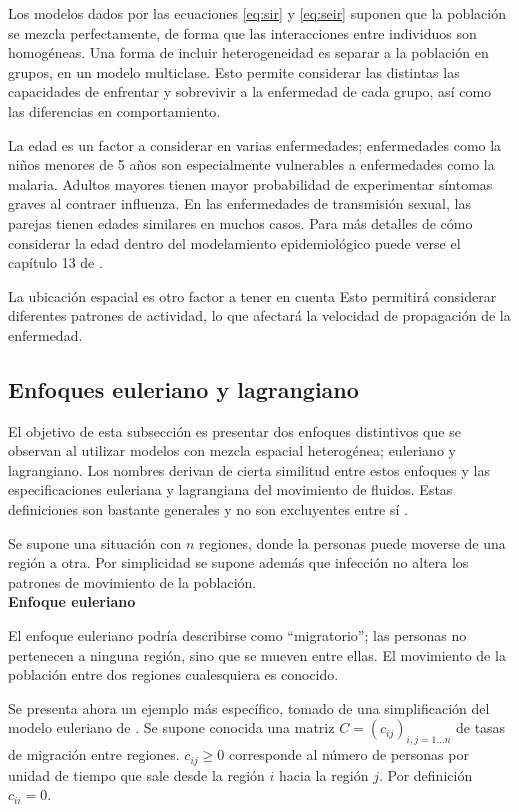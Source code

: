 Los modelos dados por las ecuaciones \ref{eq:sir} y \ref{eq:seir} suponen que la población se mezcla perfectamente, de forma que las interacciones entre individuos son homogéneas. Una forma de incluir heterogeneidad es separar a la población en grupos, en un modelo multiclase. Esto permite considerar las distintas las capacidades de enfrentar y sobrevivir a la enfermedad de cada grupo, así como las diferencias en comportamiento.

La edad es un factor a considerar en varias enfermedades; enfermedades como la  niños menores de 5 años son especialmente vulnerables a enfermedades como la malaria. Adultos mayores tienen mayor probabilidad de experimentar síntomas graves al contraer influenza. En las enfermedades de transmisión sexual, las parejas tienen edades similares en muchos casos. Para más detalles de cómo considerar la edad dentro del modelamiento epidemiológico puede verse el capítulo 13 de \cite{Brauer2019}.

La ubicación espacial es otro factor a tener en cuenta
Esto permitirá considerar diferentes patrones de actividad, lo que afectará la velocidad de propagación de la enfermedad.
\subsection{Enfoques euleriano y lagrangiano}

El objetivo de esta subsección es presentar dos enfoques distintivos que se observan al utilizar modelos con mezcla espacial heterogénea; euleriano y lagrangiano. Los nombres derivan de cierta similitud entre estos enfoques y las especificaciones euleriana y lagrangiana del movimiento de fluidos. Estas definiciones son bastante generales y no son excluyentes entre sí \cite{Cosner2009}.

Se supone una situación con \(n\) regiones, donde la personas puede moverse de una región a otra. Por simplicidad se supone además que infección no altera los patrones de movimiento de la población.\\


\noindent \textbf{Enfoque euleriano}

El enfoque euleriano podría describirse como ``migratorio''; las personas no pertenecen a ninguna región, sino que se mueven entre ellas. El movimiento de la población entre dos regiones cualesquiera es conocido.

Se presenta ahora un ejemplo más específico, tomado de una simplificación del modelo euleriano de \cite{Hsieh2007}. Se supone conocida una matriz \(C = (c_{ij})_{i, j = 1\dots n}\) de tasas de migración entre regiones.  \(c_{ij} \geq 0\) corresponde al número de personas por unidad de tiempo que sale desde la región \(i\) hacia la región \(j\). Por definición \(c_{ii} = 0\). 


